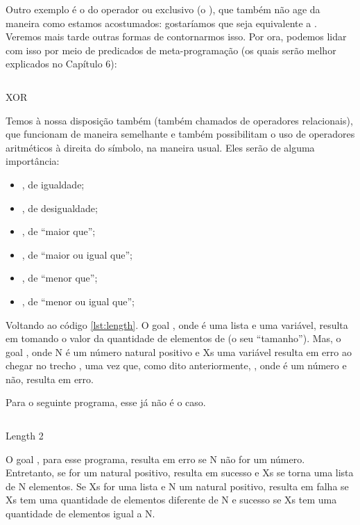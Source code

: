\documentclass{article}
\begin{document}
Outro exemplo é o do operador ou exclusivo (o ), que
também não age da maneira como estamos acostumados: gostaríamos que
 seja equivalente a .  Veremos
mais tarde outras formas de contornarmos isso. Por ora, podemos lidar
com isso por meio de predicados de meta-programação (os quais serão
melhor explicados no Capítulo 6):

    \begin{listing}
\inputminted{prolog}{../Exemplos/Cap6/prog3_xor.pl}
  \caption{XOR}\label{lst:xor}
    \end{listing}

Temos à nossa disposição também 
(também chamados de operadores relacionais), que funcionam de maneira
semelhante e também possibilitam o uso de operadores aritméticos à
direita do símbolo, na maneira usual. Eles serão de alguma
importância:

\begin{itemize}
  \item {}, de igualdade;
  \item {}, de desigualdade;
  \item {}, de ``maior que'';
  \item {}, de ``maior ou igual que'';
  \item {}, de ``menor que'';
  \item {}, de ``menor ou igual que'';
\end{itemize}



Voltando ao código \ref{lst:length}.  O goal ,
onde  é uma lista e  uma variável, resulta em 
tomando o valor da quantidade de elementos de  (o seu
``tamanho'').  Mas, o goal , onde N é um número
natural positivo e Xs uma variável resulta em erro ao chegar no trecho
, uma vez que, como dito anteriormente, , onde  é um número e  não, resulta em erro.

Para o seguinte programa, esse já não é o caso.

    \begin{listing}
\inputminted{prolog}{../Exemplos/Cap3/prog3_length2.pl}
\caption{Length 2}\label{lst:length2}
    \end{listing}

O goal , para esse programa, resulta em erro se
N não for um número. Entretanto, se for um natural positivo,
 resulta em sucesso e Xs se torna uma lista de
N elementos. Se Xs for uma lista e N um natural positivo,
 resulta em falha se Xs tem uma quantidade de
elementos diferente de N e sucesso se Xs tem uma quantidade de
elementos igual a N.
\end{document}
